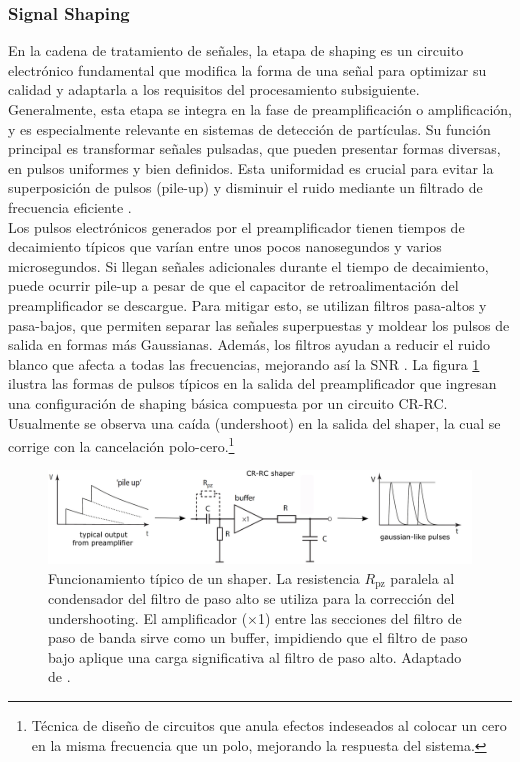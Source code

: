 \documentclass[]{book}
\begin{document}
\subsubsection{Signal Shaping}

\noindent En la cadena de tratamiento de señales, la etapa de shaping es un circuito electrónico fundamental que modifica la forma de una señal para optimizar su calidad y adaptarla a los requisitos del procesamiento subsiguiente. Generalmente, esta etapa se integra en la fase de preamplificación o amplificación, y es especialmente relevante en sistemas de detección de partículas. Su función principal es transformar señales pulsadas, que pueden presentar formas diversas, en pulsos uniformes y bien definidos. Esta uniformidad es crucial para evitar la superposición de pulsos (pile-up) y disminuir el ruido mediante un filtrado de frecuencia eficiente \cite{leo1994techniques}.\\

\noindent Los pulsos electrónicos generados por el preamplificador tienen tiempos de decaimiento típicos que varían entre unos pocos nanosegundos y varios microsegundos. Si llegan señales adicionales durante el tiempo de decaimiento, puede ocurrir pile-up a pesar de que el capacitor de retroalimentación del preamplificador se descargue. Para mitigar esto, se utilizan filtros pasa-altos y pasa-bajos, que permiten separar las señales superpuestas y moldear los pulsos de salida en formas más Gaussianas. Además, los filtros ayudan a reducir el ruido blanco que afecta a todas las frecuencias, mejorando así la SNR \cite{kolanoski2020particle}. La figura \ref{fig:shaper} ilustra las formas de pulsos típicos en la salida del preamplificador que ingresan una configuración de shaping básica compuesta por un circuito CR-RC. Usualmente se observa una caída (undershoot) en la salida del shaper, la cual se corrige con la cancelación polo-cero.\footnote{Técnica de diseño de circuitos que anula efectos indeseados al colocar un cero en la misma frecuencia que un polo, mejorando la respuesta del sistema.} \\

\begin{figure}[h]
    \centering
    \includegraphics[width=1.0\textwidth]{shaper_chain.png}
    \caption{Funcionamiento típico de un shaper. La resistencia $R_{\text{pz}}$ paralela al condensador del filtro de paso alto se utiliza para la corrección del undershooting. El amplificador (×1) entre las secciones del filtro de paso de banda sirve como un buffer, impidiendo que el filtro de paso bajo aplique una carga significativa al filtro de paso alto. Adaptado de \cite{kolanoski2020particle}.}
    \label{fig:shaper}
\end{figure}
\end{document}
